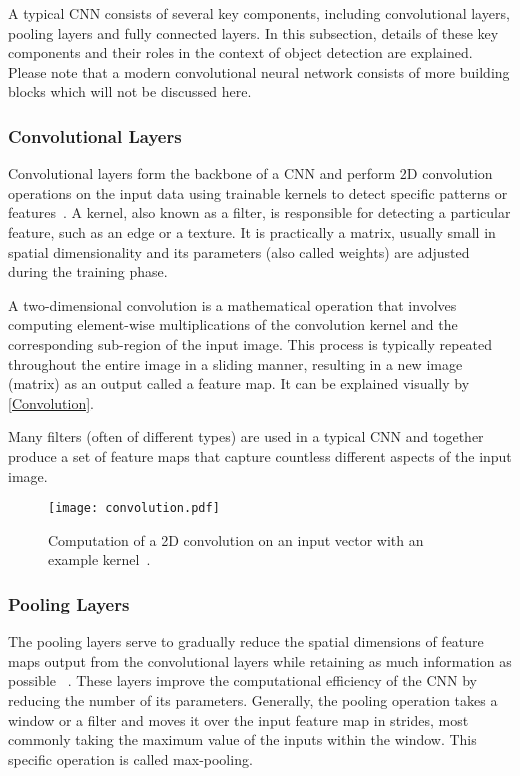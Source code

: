 A typical CNN consists of several key components, including convolutional
layers, pooling layers and fully connected layers. In this subsection, details
of these key components and their roles in the context of object detection are
explained. Please note that a modern convolutional neural network consists of
more building blocks which will not be discussed here.

\subsubsection{Convolutional Layers}

Convolutional layers form the backbone of a CNN and perform 2D convolution
operations on the input data using trainable kernels to detect specific patterns
or features~\cite{OShea2015}. A kernel, also known as a filter, is responsible
for detecting a particular feature, such as an edge or a texture. It is
practically a matrix, usually small in spatial dimensionality and its
parameters (also called weights) are adjusted during the training phase.

A two-dimensional convolution is a mathematical operation that involves
computing element-wise multiplications of the convolution kernel and the
corresponding sub-region of the input image. This process is typically repeated
throughout the entire image in a sliding manner, resulting in a new image
(matrix) as an output called a feature map. It can be explained visually by
\autoref{Convolution}.

Many filters (often of different types) are used in a typical CNN and together
produce a set of feature maps that capture countless different aspects of the
input image.

\begin{figure}[t]
    \centering
    \texttt{[image: convolution.pdf]}
    \caption{Computation of a 2D convolution on an input vector with an example kernel~\cite{OShea2015}.}
    \label{Convolution}
\end{figure}


\subsubsection{Pooling Layers}

The pooling layers serve to gradually reduce the spatial dimensions of feature
maps output from the convolutional layers while retaining as much information as
possible ~\cite{OShea2015}. These layers improve the computational efficiency of
the CNN by reducing the number of its parameters. Generally, the pooling
operation takes a window or a filter and moves it over the input feature map in
strides, most commonly taking the maximum value of the inputs within the window.
This specific operation is called max-pooling.


